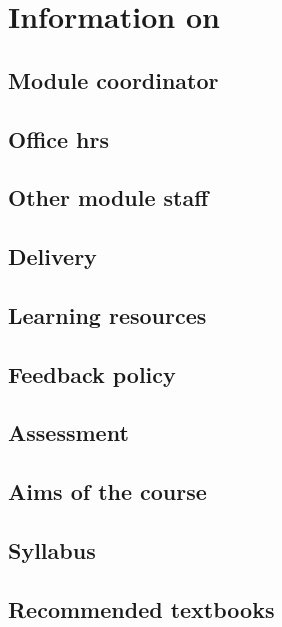 \renewcommand{\prevpart}{0 }
\renewcommand{\thispart}{0 }
\renewcommand{\nextpart}{0 }

\setcounter{section}{-1}
\section{Information on \modulename}

\subsection{Module coordinator}


\subsection{Office hrs}


\subsection{Other module staff}


\subsection{Delivery}


\subsection{Learning resources}

\subsection{Feedback policy}


\subsection{Assessment}


\subsection{Aims of the course}


\subsection{Syllabus}


\subsection{Recommended textbooks}


